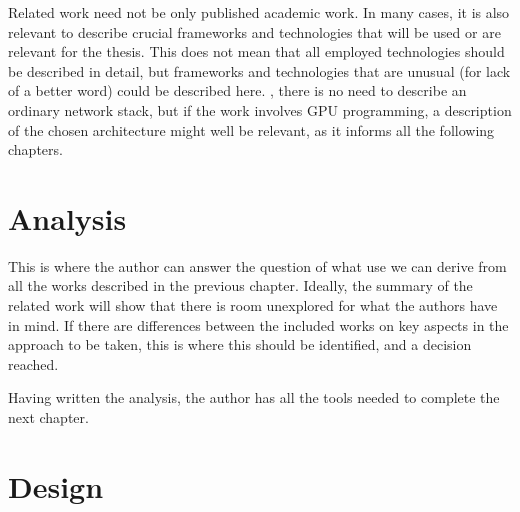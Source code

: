 \documentclass[ twoside,openright,titlepage,numbers=noenddot,headinclude,%
                footinclude=true,cleardoublepage=empty,abstractoff, %
                BCOR=5mm,paper=a4,fontsize=11pt,%
                ngerman,american,%
                ]{scrreprt}
\begin{document}
Related work need not be only published academic work. In many cases,
it is also relevant to describe crucial frameworks and technologies
that will be used or are relevant for the thesis.  This does not mean
that all employed technologies should be described in detail, but
frameworks and technologies that are unusual (for lack of a better
word) could be described here. \Eg, there is no need to describe an
ordinary network stack, but if the work involves GPU programming, a
description of the chosen architecture might well be relevant, as it
informs all the following chapters.



\chapter{Analysis}
\label{cha:analysis}

This is where the author can answer the question of what use we can
derive from all the works described in the previous chapter. Ideally,
the summary of the related work will show that there is room
unexplored for what the authors have in mind. If there are differences
between the included works on key aspects in the approach to be taken,
this is where this should be identified, and a decision reached.

Having written the analysis, the author has all the tools needed to
complete the next chapter.


\chapter{Design}
\label{cha:design}





\end{document}
